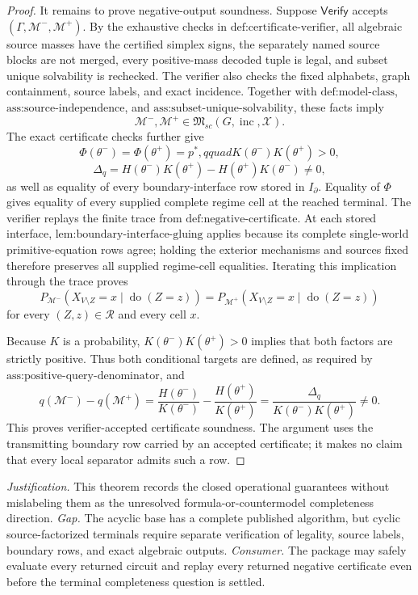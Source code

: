 \documentclass{article}
\begin{document}
\begin{proof}
It remains to prove negative-output soundness.  Suppose \(\mathsf{Verify}\) accepts \((\Gamma,\mathcal M^-,\mathcal M^+)\).  By the exhaustive checks in \(\text{def:certificate-verifier}\), all algebraic source masses have the certified simplex signs, the separately named source blocks are not merged, every positive-mass decoded tuple is legal, and subset unique solvability is rechecked.  The verifier also checks the fixed alphabets, graph containment, source labels, and exact incidence.  Together with \(\text{def:model-class}\), \(\text{ass:source-independence}\), and \(\text{ass:subset-unique-solvability}\), these facts imply
\[
 \mathcal M^-,\mathcal M^+
 \in\mathfrak M_{sc}(G,\operatorname{inc},\mathcal X).
\]
The exact certificate checks further give
\[
 \Phi(\theta^-)=\Phi(\theta^+)=p^*,qquad
 K(\theta^-)K(\theta^+)>0,
\]
\[
 \Delta_q
 =H(\theta^-)K(\theta^+)-H(\theta^+)K(\theta^-)
 \ne0,
\]
as well as equality of every boundary-interface row stored in \(I_{\partial}\).  Equality of \(\Phi\) gives equality of every supplied complete regime cell at the reached terminal.  The verifier replays the finite trace from \(\text{def:negative-certificate}\).  At each stored interface, \(\text{lem:boundary-interface-gluing}\) applies because its complete single-world primitive-equation rows agree; holding the exterior mechanisms and sources fixed therefore preserves all supplied regime-cell equalities.  Iterating this implication through the trace proves
\[
 P_{\mathcal M^-}(X_{V\setminus Z}=x\mid\operatorname{do}(Z=z))
 =P_{\mathcal M^+}(X_{V\setminus Z}=x\mid\operatorname{do}(Z=z))
\]
for every \((Z,z)\in\mathcal R\) and every cell \(x\).

Because \(K\) is a probability, \(K(\theta^-)K(\theta^+)>0\) implies that both factors are strictly positive.  Thus both conditional targets are defined, as required by \(\text{ass:positive-query-denominator}\), and
\[
 q(\mathcal M^-)-q(\mathcal M^+)
 =\frac{H(\theta^-)}{K(\theta^-)}
  -\frac{H(\theta^+)}{K(\theta^+)}
 =\frac{\Delta_q}{K(\theta^-)K(\theta^+)}\ne0.
\]
This proves verifier-accepted certificate soundness.  The argument uses the transmitting boundary row carried by an accepted certificate; it makes no claim that every local separator admits such a row.
\end{proof}
\par\smallskip\noindent \textit{Justification.} This theorem records the closed operational guarantees without mislabeling them as the unresolved formula-or-countermodel completeness direction. \textit{Gap.} The acyclic base has a complete published algorithm, but cyclic source-factorized terminals require separate verification of legality, source labels, boundary rows, and exact algebraic outputs. \textit{Consumer.} The package may safely evaluate every returned circuit and replay every returned negative certificate even before the terminal completeness question is settled.
\end{document}
